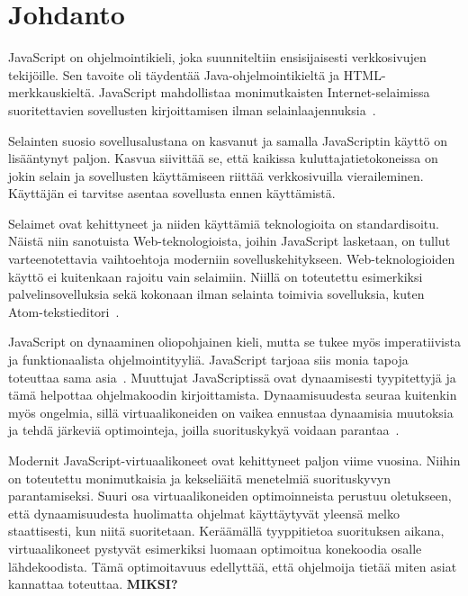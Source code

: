 \section{Johdanto}

JavaScript on ohjelmointikieli, joka suunniteltiin ensisijaisesti verkkosivujen tekijöille. Sen tavoite oli täydentää Java-ohjelmointikieltä ja HTML-merkkauskieltä. JavaScript mahdollistaa monimutkaisten Internet-selaimissa suoritettavien sovellusten kirjoittamisen ilman selainlaajennuksia~\cite{paolini1994netscape}.

Selainten suosio sovellusalustana on kasvanut ja samalla JavaScriptin käyttö on lisääntynyt paljon. Kasvua siivittää se, että kaikissa kuluttajatietokoneissa on jokin selain ja sovellusten käyttämiseen riittää verkkosivuilla vieraileminen. Käyttäjän ei tarvitse asentaa sovellusta ennen käyttämistä.

Selaimet ovat kehittyneet ja niiden käyttämiä teknologioita on standardisoitu. Näistä niin sanotuista Web-teknologioista, joihin JavaScript lasketaan, on tullut varteenotettavia vaihtoehtoja moderniin sovelluskehitykseen. Web-teknologioiden käyttö ei kuitenkaan rajoitu vain selaimiin. Niillä on toteutettu esimerkiksi palvelinsovelluksia sekä kokonaan ilman selainta toimivia sovelluksia, kuten Atom-tekstieditori~\cite{atom}.

JavaScript on dynaaminen oliopohjainen kieli, mutta se tukee myös imperatiivista ja funktionaalista ohjelmointityyliä. JavaScript tarjoaa siis monia tapoja toteuttaa sama asia~\cite[4.2.1.]{es6}. Muuttujat JavaScriptissä ovat dynaamisesti tyypitettyjä ja tämä helpottaa ohjelmakoodin kirjoittamista. Dynaamisuudesta seuraa kuitenkin myös ongelmia, sillä virtuaalikoneiden on vaikea ennustaa dynaamisia muutoksia ja tehdä järkeviä optimointeja, joilla suorituskykyä voidaan parantaa~\cite{Ahn2014}.

Modernit JavaScript-virtuaalikoneet ovat kehittyneet paljon viime vuosina. Niihin on toteutettu monimutkaisia ja kekseliäitä menetelmiä suorituskyvyn parantamiseksi. Suuri osa virtuaalikoneiden optimoinneista perustuu oletukseen, että dynaamisuudesta huolimatta ohjelmat käyttäytyvät yleensä melko staattisesti, kun niitä suoritetaan. Keräämällä tyyppitietoa suorituksen aikana, virtuaalikoneet pystyvät esimerkiksi luomaan optimoitua konekoodia osalle lähdekoodista. Tämä optimoitavuus edellyttää, että ohjelmoija tietää miten asiat kannattaa toteuttaa. \textbf{MIKSI?}


